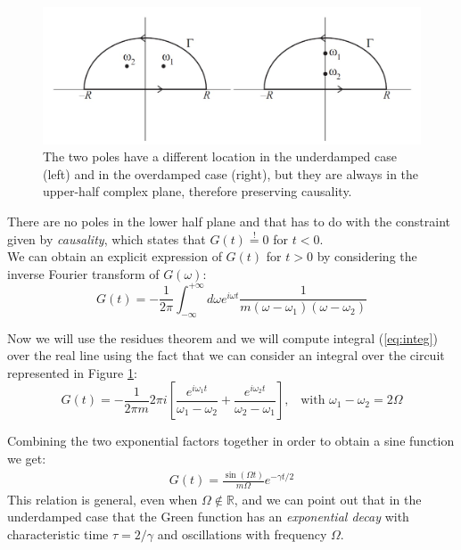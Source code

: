 \documentclass[\main/main.tex]{subfiles}
\begin{document}
\begin{figure}[ht]
    \centering
    \includegraphics[width=\linewidth]{Lectures/Images/poles.jpg}
    \caption{The two poles have a different
location in the underdamped case (left) and in the overdamped case (right), but they are always in the upper-half
complex plane, therefore preserving causality.}
    \label{fig:poles}
\end{figure}

There are no poles in the lower half plane and that has to do with the constraint given by \textit{causality}, which states that $G(t)\overset{!}{=}0$ for $t<0$. \\

We can obtain an explicit expression of $G(t)$ for $t>0$ by considering the inverse Fourier transform of $G(\omega)$:
\begin{equation}
G(t)=-\frac{1}{2 \pi} \int_{-\infty}^{+\infty} d \omega e^{i \omega t} \frac{1}{m\left(\omega-\omega_{1}\right)\left(\omega-\omega_{2}\right)}
\label{eq:integ}
\end{equation}

Now we will use the residues theorem and we will compute integral (\ref{eq:integ}) over the real line using the fact that we can consider an integral over the circuit represented in Figure \ref{fig:poles}:
\begin{equation}
G(t)=-\frac{1}{2 \pi m} 2 \pi i\left[\frac{e^{i \omega_{1} t}}{\omega_{1}-\omega_{2}}+\frac{e^{i \omega_{2} t}}{\omega_{2}-\omega_{1}}\right], \,\,\,\,\, \text{with} \,\, \omega_1-\omega_2=2\Omega
\end{equation}

Combining the two exponential factors together in order to obtain a sine function we get:
\begin{align}
    \boxed{G(t)=\frac{\sin (\Omega t)}{m \Omega} e^{-\gamma t / 2}}
\end{align}
This relation is general, even when $\Omega \notin \mathbb{R}$, and we can point out that in the underdamped case that the Green function has an\textit{ exponential decay } with characteristic time $\tau=2/\gamma$ and oscillations with frequency $\Omega$.
\end{document}
